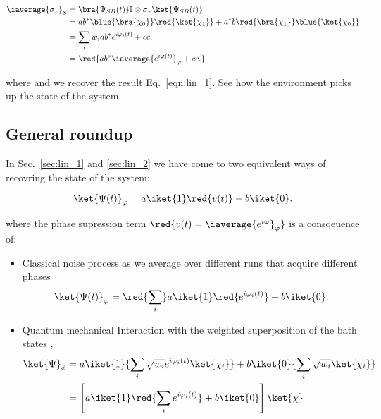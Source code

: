    \begin{equation}\label{key}
     \begin{aligned}
       \iaverage{\sigma_x}_S & = \bra{\Psi_{SB}(t)}\mathbb{I} \otimes \sigma_x\ket{\Psi_{SB}(t)} \\
       & = ab^{*}\blue{\bra{\chi_0}}\red{\ket{\chi_1}} + a^{*}b\red{\bra{\chi_1}}\blue{\ket{\chi_0}}\\
       & = \sum_iw_iab^{*}e^{i\varphi_i(t)} + cc.\\
       & = \red{ab^{*}\iaverage{e^{i\varphi(t)}}_\varphi + cc.}
     \end{aligned}
   \end{equation}
  
   \noindent                                                                             where
    and we  recover the result Eq.~\eqref{eqn:lin_1}.
   See how the environment picks up the state of the system
  
 \subsection{General roundup}
 In Sec.~\ref{sec:lin_1} and \ref{sec:lin_2} we have  come to two equivalent ways of recovring
 the state of the system:
  
  \begin{equation}\label{key}
    \ket{\Psi(t)}_\varphi = a\iket{1}\red{v(t)} + b\iket{0}.
  \end{equation}
  
  \noindent where the  phase supression term $ \red{v(t)  = \iaverage{e^{i\varphi}}_\varphi} $
  is a consqeuence of:
  
  \begin{itemize}
  \item  Classical noise  process as  we average  over different  runs that  acquire different
    phases
    \begin{equation}\label{key}
      \ket{\Psi(t)}_\varphi = \red{\sum_i} a\iket{1}\red{e^{i\varphi_i(t)}} + b\iket{0}.
    \end{equation}
  \item Quantum  mechanical Interaction  with the  weighted superposition  of the  bath states
    ,
    \begin{equation}\label{key}
      \begin{aligned}
        \ket{\Psi}_\phi & = 	a\iket{1}{\sum_i\sqrt{w_i}e^{i\varphi_i(t)}\ket{\chi_i}} + b\iket{0}{\sum_i\sqrt{w_i}\ket{\chi_i}}\\
        & = \left[a\iket{1}\red{\sum_ie^{i\varphi_i(t)}} + b\iket{0}\right]\ket{\chi}
      \end{aligned}
    \end{equation}
  \end{itemize}
  
